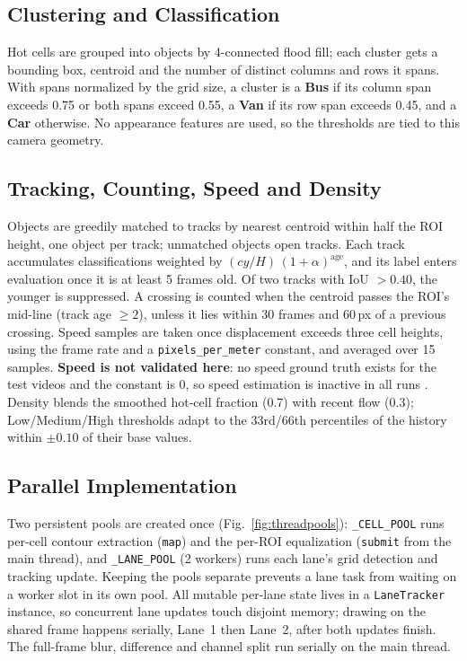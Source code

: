 \documentclass[conference]{IEEEtran}
\newcommand{\code}[1]{\texttt{#1}}
\begin{document}
\subsection{Clustering and Classification}
\label{sec:classify}
Hot cells are grouped into objects by 4-connected flood fill; each
cluster gets a bounding box, centroid and the number of distinct columns
and rows it spans. With spans normalized by the grid size, a cluster is
a \textbf{Bus} if its column span exceeds 0.75 or both spans exceed
0.55, a \textbf{Van} if its row span exceeds 0.45, and a \textbf{Car}
otherwise. No appearance features are used, so the thresholds are tied
to this camera geometry.

\subsection{Tracking, Counting, Speed and Density}
\label{sec:tracking}
Objects are greedily matched to tracks by nearest centroid within half
the ROI height, one object per track; unmatched objects open tracks.
Each track accumulates classifications weighted by
$(cy/H)\,(1{+}\alpha)^{\text{age}}$, and its label enters evaluation once
it is at least 5 frames old. Of two tracks with IoU $>0.40$, the younger
is suppressed. A crossing is counted when the centroid passes the ROI's
mid-line (track age $\geq 2$), unless it lies within 30 frames and 60\,px
of a previous crossing. Speed samples are taken once displacement
exceeds three cell heights, using the frame rate and a
\code{pixels\_per\_meter} constant, and averaged over 15 samples.
\textbf{Speed is not validated here}: no speed ground truth exists for
the test videos and the constant is 0, so speed estimation is inactive
in all runs \cite{kamil2024,sangsuwan2024}. Density blends the smoothed
hot-cell fraction (0.7) with recent flow (0.3); Low/Medium/High
thresholds adapt to the 33rd/66th percentiles of the history within
$\pm0.10$ of their base values.

\subsection{Parallel Implementation}
\label{sec:parallel}
Two persistent pools are created once (Fig.~\ref{fig:threadpools}):
\code{\_CELL\_POOL} runs per-cell contour extraction (\code{map}) and the
per-ROI equalization (\code{submit} from the main thread), and
\code{\_LANE\_POOL} (2 workers) runs each lane's grid detection and
tracking update. Keeping the pools separate prevents a lane task from
waiting on a worker slot in its own pool. All mutable per-lane state
lives in a \code{LaneTracker} instance, so concurrent lane updates touch
disjoint memory; drawing on the shared frame happens serially, Lane~1
then Lane~2, after both updates finish. The full-frame blur, difference
and channel split run serially on the main thread.
\end{document}
